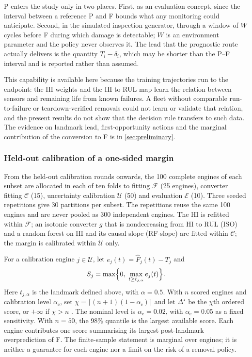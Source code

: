 \documentclass[preprint,12pt]{elsarticle}
\begin{document}
P enters the study only in two places. First, as an evaluation concept, since the interval between a reference P and F bounds what any monitoring could anticipate. Second, in the simulated inspection generator, through a window of $W$ cycles before F during which damage is detectable; $W$ is an environment parameter and the policy never observes it. The lead that the prognostic route actually delivers is the quantity $T_i-\delta_i$, which may be shorter than the P--F interval and is reported rather than assumed.

This capability is available here because the training trajectories run to the endpoint: the HI weights and the HI-to-RUL map learn the relation between sensors and remaining life from known failures. A fleet without comparable run-to-failure or teardown-verified removals could not learn or validate that relation, and the present results do not show that the decision rule transfers to such data. The evidence on landmark lead, first-opportunity actions and the marginal contribution of the conversion to F is in \cref{sec:preliminary}.

\subsubsection{Held-out calibration of a one-sided margin}\label{sec:margin}

From the held-out calibration rounds onwards, the 100 complete engines of each subset are allocated in each of ten folds to fitting $\mathcal F$ (25 engines), converter fitting $\mathcal C$ (15), uncertainty calibration $\mathcal U$ (50) and evaluation $\mathcal E$ (10). Three seeded repetitions give 30 partitions per subset. The repetitions reuse the same 100 engines and are never pooled as 300 independent engines. The HI is refitted within $\mathcal F$; an isotonic converter $g$ that is nondecreasing from HI to RUL (ISO) and a random forest on HI and its causal slope (RF-slope) are fitted within $\mathcal C$; the margin is calibrated within $\mathcal U$ only.

For a calibration engine $j\in\mathcal U$, let $e_j(t)=\widehat F_j(t)-T_j$ and
\[
S_j=\max\Bigl\{0,\ \max_{t\geq t_{j,\alpha}} e_j(t)\Bigr\}.
\]
Here $t_{j,\alpha}$ is the landmark defined above, with $\alpha=0.5$. With $n$ scored engines and calibration level $\alpha_{\mathrm c}$, set $\chi=\lceil(n+1)(1-\alpha_{\mathrm c})\rceil$ and let $\Delta^{\star}$ be the $\chi$th ordered score, or $+\infty$ if $\chi>n$ \cite{Lei2018}. The nominal level is $\alpha_{\mathrm c}=0.02$, with $\alpha_{\mathrm c}=0.05$ as a fixed sensitivity. With $n=50$, the 98\% quantile is the largest available score. Each engine contributes one score summarising its largest post-landmark overprediction of F. The finite-sample statement is marginal over engines; it is neither a guarantee for each engine nor a limit on the risk of a removal policy.
\end{document}

